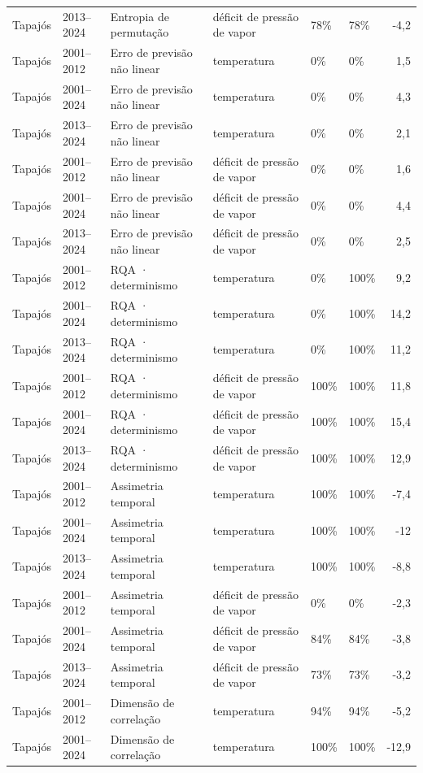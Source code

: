 \begin{table}
\begin{tabular}{llllllr}
Tapajós & 2013–2024 & Entropia de permutação & déficit de pressão de vapor & 78\% & 78\% & -4,2 \\
Tapajós & 2001–2012 & Erro de previsão não linear & temperatura & 0\% & 0\% & 1,5 \\
Tapajós & 2001–2024 & Erro de previsão não linear & temperatura & 0\% & 0\% & 4,3 \\
Tapajós & 2013–2024 & Erro de previsão não linear & temperatura & 0\% & 0\% & 2,1 \\
Tapajós & 2001–2012 & Erro de previsão não linear & déficit de pressão de vapor & 0\% & 0\% & 1,6 \\
Tapajós & 2001–2024 & Erro de previsão não linear & déficit de pressão de vapor & 0\% & 0\% & 4,4 \\
Tapajós & 2013–2024 & Erro de previsão não linear & déficit de pressão de vapor & 0\% & 0\% & 2,5 \\
Tapajós & 2001–2012 & RQA · determinismo & temperatura & 0\% & 100\% & 9,2 \\
Tapajós & 2001–2024 & RQA · determinismo & temperatura & 0\% & 100\% & 14,2 \\
Tapajós & 2013–2024 & RQA · determinismo & temperatura & 0\% & 100\% & 11,2 \\
Tapajós & 2001–2012 & RQA · determinismo & déficit de pressão de vapor & 100\% & 100\% & 11,8 \\
Tapajós & 2001–2024 & RQA · determinismo & déficit de pressão de vapor & 100\% & 100\% & 15,4 \\
Tapajós & 2013–2024 & RQA · determinismo & déficit de pressão de vapor & 100\% & 100\% & 12,9 \\
Tapajós & 2001–2012 & Assimetria temporal & temperatura & 100\% & 100\% & -7,4 \\
Tapajós & 2001–2024 & Assimetria temporal & temperatura & 100\% & 100\% & -12 \\
Tapajós & 2013–2024 & Assimetria temporal & temperatura & 100\% & 100\% & -8,8 \\
Tapajós & 2001–2012 & Assimetria temporal & déficit de pressão de vapor & 0\% & 0\% & -2,3 \\
Tapajós & 2001–2024 & Assimetria temporal & déficit de pressão de vapor & 84\% & 84\% & -3,8 \\
Tapajós & 2013–2024 & Assimetria temporal & déficit de pressão de vapor & 73\% & 73\% & -3,2 \\
Tapajós & 2001–2012 & Dimensão de correlação & temperatura & 94\% & 94\% & -5,2 \\
Tapajós & 2001–2024 & Dimensão de correlação & temperatura & 100\% & 100\% & -12,9 \\

\end{tabular}
\end{table}
